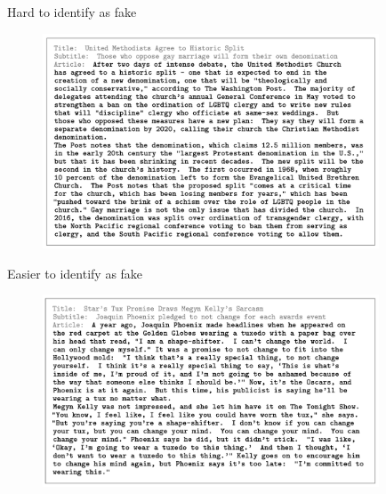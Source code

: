 \begin{vbframe}{Hard to identify as fake}

\vfill

	\begin{figure}
		\centering
		\includegraphics[width=10cm]{figure/hardtoidentify.png}
	\end{figure}

\vfill

\end{vbframe}




\begin{vbframe}{Easier to identify as fake}

\vfill

	\begin{figure}
		\centering
		\includegraphics[width=10cm]{figure/easytoidentify.png}
	\end{figure}

\vfill

\end{vbframe}




